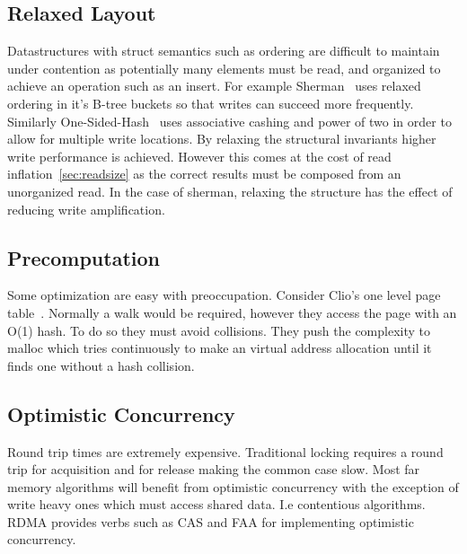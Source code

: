 \subsection{Relaxed Layout} Datastructures with struct semantics such as
ordering are difficult to maintain under contention as potentially many elements
must be read, and organized to achieve an operation such as an insert. For
example Sherman~\cite{sherman} uses relaxed ordering in it's B-tree buckets so
that writes can succeed more frequently. Similarly
One-Sided-Hash~\cite{one-sided-hash} uses associative cashing and power of two
in order to allow for multiple write locations. By relaxing the structural
invariants higher write performance is achieved. However this comes at the cost
of read inflation~\ref{sec:readsize} as the correct results must be composed
from an unorganized read. In the case of sherman, relaxing the structure has the
effect of reducing write amplification.


\subsection{Precomputation} Some optimization are easy with preoccupation. Consider
Clio's one level page table~\cite{clio}. Normally a walk would be required, however they
access the page with an O(1) hash. To do so they must avoid collisions. They
push the complexity to malloc which tries continuously to make an virtual address
allocation until it finds one without a hash collision.

\subsection{Optimistic Concurrency} Round trip times are extremely expensive.
Traditional locking requires a round trip for acquisition and for release making
the common case slow. Most far memory algorithms will benefit from optimistic
concurrency with the exception of write heavy ones which must access shared
data. I.e contentious algorithms. RDMA provides verbs such as CAS and FAA for
implementing optimistic concurrency.

